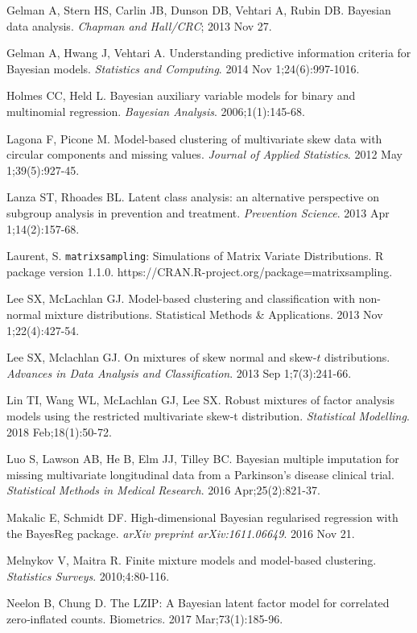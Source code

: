 \documentclass[useAMS,referee]{biom}
\begin{document}
\begin{thebibliography}{}
\bibitem{ } Gelman A, Stern HS, Carlin JB, Dunson DB, Vehtari A, Rubin DB. Bayesian data analysis. \textit{Chapman and Hall/CRC}; 2013 Nov 27.

\bibitem{ } Gelman A, Hwang J, Vehtari A. Understanding predictive information criteria for Bayesian models. \textit{Statistics and Computing}. 2014 Nov 1;24(6):997-1016.

\bibitem{ } Holmes CC, Held L. Bayesian auxiliary variable models for binary and multinomial regression. \textit{Bayesian Analysis}. 2006;1(1):145-68.

\bibitem{ } Lagona F, Picone M. Model-based clustering of multivariate skew data with circular components and missing values. \textit{Journal of Applied Statistics}. 2012 May 1;39(5):927-45.

\bibitem{ } Lanza ST, Rhoades BL. Latent class analysis: an alternative perspective on subgroup analysis in prevention and treatment. \textit{Prevention Science}. 2013 Apr 1;14(2):157-68.

\bibitem{ } Laurent, S. \texttt{matrixsampling}: Simulations of Matrix Variate Distributions. R package version 1.1.0.
https://CRAN.R-project.org/package=matrixsampling.

\bibitem{ } Lee SX, McLachlan GJ. Model-based clustering and classification with non-normal mixture distributions. Statistical Methods \& Applications. 2013 Nov 1;22(4):427-54.

\bibitem{ } Lee SX, Mclachlan GJ. On mixtures of skew normal and skew-$t$ distributions. \textit{Advances in Data Analysis and Classification}. 2013 Sep 1;7(3):241-66.

\bibitem{ } Lin TI, Wang WL, McLachlan GJ, Lee SX. Robust mixtures of factor analysis models using the restricted multivariate skew-t distribution. \textit{Statistical Modelling}. 2018 Feb;18(1):50-72.

\bibitem{ } Luo S, Lawson AB, He B, Elm JJ, Tilley BC. Bayesian multiple imputation for missing multivariate longitudinal data from a Parkinson's disease clinical trial. \textit{Statistical Methods in Medical Research}. 2016 Apr;25(2):821-37.

\bibitem{ } Makalic E, Schmidt DF. High-dimensional Bayesian regularised regression with the BayesReg package. \textit{arXiv preprint arXiv:1611.06649}. 2016 Nov 21.

\bibitem{ } Melnykov V, Maitra R. Finite mixture models and model-based clustering. \textit{Statistics Surveys}. 2010;4:80-116.

\bibitem{ } Neelon B, Chung D. The LZIP: A Bayesian latent factor model for correlated zero‐inflated counts. Biometrics. 2017 Mar;73(1):185-96.


\end{thebibliography}
\end{document}
